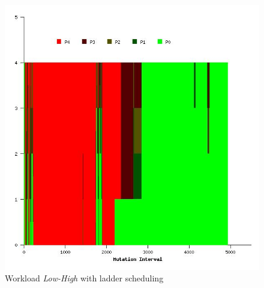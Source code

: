 \begin{figure}
  \begin{center}
    \includegraphics[scale=0.4]{figures/mutation_timeline_figures/mut_t1/Low-High/125_4.jpeg}%
    \caption{Workload \textit{Low-High} with ladder scheduling}
    \label{fig:wrk_lowhigh_ladder}
  \end{center}
\end{figure}

